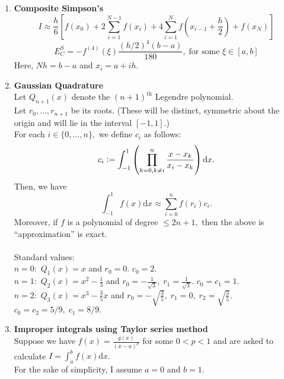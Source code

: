 \documentclass[12pt]{article}
\theoremstyle{definition}
\begin{document}
\begin{enumerate}
	\item \textbf{Composite Simpson's}
	\[I \approx \frac{h}{6}\left[f(x_0) + 2\sum_{i=1}^{N-1}f(x_i) + 4\sum_{i=1}^{N}f\left(x_{i-1} + \frac{h}{2}\right) + f(x_N)\right]\]
	\[E_C^{S} = -f^{(4)}(\xi)\frac{(h/2)^4(b-a)}{180},\;\text{for some }\xi\in[a, b]\]
	Here, $Nh = b-a$ and $x_i = a + ih.$\\
	\item \textbf{Gaussian Quadrature}\\
	Let $Q_{n+1}(x)$ denote the $(n+1)^{\text{th}}$ Legendre polynomial.\\
	Let $r_0, \ldots, r_{n+1}$ be its roots. (These will be distinct, symmetric about the origin and will lie in the interval $[-1, 1].$)\\
	For each $i \in \{0, \ldots, n\},$ we define $c_i$ as follows:
	\[c_i \vcentcolon= \int_{-1}^{1} \left(\prod_{k = 0, k \neq i}^{n}\frac{x - x_k}{x_i - x_k}\right) {\mathrm d}x.\]
	Then, we have
	\[\int_{-1}^{1} f(x) {\mathrm d}x \approx \displaystyle\sum_{i=0}^{n}f(r_i)c_i.\]
	Moreover, if $f$ is a polynomial of degree $\le 2n+1,$ then the above is ``approximation'' is exact.\\~\\
	Standard values: \\
	$n = 0:$ $Q_1(x) = x$ and $r_0 = 0.$ $c_0 = 2.$\\
	$n = 1:$ $Q_2(x) = x^2 - \frac{1}{3}$ and $r_0 = -\frac{1}{\sqrt{3}},\;r_1 = \frac{1}{\sqrt{3}}.$ $c_0 = c_1 = 1.$\\
	$n = 2:$ $Q_3(x) = x^3 - \frac{3}{5}x$ and $r_0 = -\sqrt{\frac{3}{5}},\;r_1 = 0,\; r_2 = \sqrt{\frac{3}{5}}.$ $c_0 = c_2 = 5/9,\;c_1 = 8/9.$
	\item \textbf{Improper integrals using Taylor series method}\\
	Suppose we have $f(x) = \frac{g(x)}{(x - a)^p}$ for some $0 < p < 1$ and are asked to calculate $I = \displaystyle\int_{a}^{b} f(x) {\mathrm d}x.$\\
	For the sake of simplicity, I assume $a = 0$ and $b = 1.$


\end{enumerate}
\end{document}
